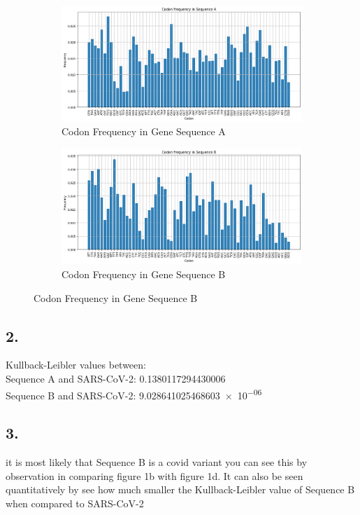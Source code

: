 \documentclass{article}
\begin{document}
\begin{figure}[h]
    \begin{subfigure}[t]{0.45\textwidth}
        \centering
        \includegraphics[width=\textwidth]{../code/histoA.png}
        \caption{Codon Frequency in Gene Sequence A}
        \label{fig:histob}
    \end{subfigure}
    \hfill
    \begin{subfigure}[t]{0.45\textwidth}
        \centering
        \includegraphics[width=\textwidth]{../code/histoB.png}
        \caption{Codon Frequency in Gene Sequence B}
        \label{fig:histoa}
    \end{subfigure}

    \label{fig:all_figures}
\end{figure}

\subsection*{2.}
Kullback-Leibler values between:\\
Sequence A and SARS-CoV-2: \num{0.1380117294430006}\\
Sequence B and SARS-CoV-2: \num{9.028641025468603e-06}

\subsection*{3.}
it is most likely that Sequence B is a covid variant you can see this by observation in comparing
figure 1b with figure 1d. It can also be seen quantitatively by see how much smaller the Kullback-Leibler value of 
Sequence B when compared to SARS-CoV-2 
\end{document}
